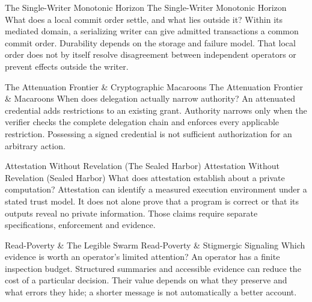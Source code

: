 \expandafter\def\csname pdlandmarktitle@05\endcsname{The Single-Writer Monotonic Horizon}
\expandafter\def\csname pdlandmarkconcept@05\endcsname{The Single-Writer Monotonic Horizon}
\expandafter\def\csname pdlandmarkquestion@05\endcsname{What does a local commit order settle, and what lies outside it?}
\expandafter\def\csname pdlandmarkquote@05\endcsname{Within its mediated domain, a serializing writer can give admitted transactions a common commit order. Durability depends on the storage and failure model. That local order does not by itself resolve disagreement between independent operators or prevent effects outside the writer.}

\expandafter\def\csname pdlandmarktitle@06\endcsname{The Attenuation Frontier \& Cryptographic Macaroons}
\expandafter\def\csname pdlandmarkconcept@06\endcsname{The Attenuation Frontier \& Macaroons}
\expandafter\def\csname pdlandmarkquestion@06\endcsname{When does delegation actually narrow authority?}
\expandafter\def\csname pdlandmarkquote@06\endcsname{An attenuated credential adds restrictions to an existing grant. Authority narrows only when the verifier checks the complete delegation chain and enforces every applicable restriction. Possessing a signed credential is not sufficient authorization for an arbitrary action.}

\expandafter\def\csname pdlandmarktitle@07\endcsname{Attestation Without Revelation (The Sealed Harbor)}
\expandafter\def\csname pdlandmarkconcept@07\endcsname{Attestation Without Revelation (Sealed Harbor)}
\expandafter\def\csname pdlandmarkquestion@07\endcsname{What does attestation establish about a private computation?}
\expandafter\def\csname pdlandmarkquote@07\endcsname{Attestation can identify a measured execution environment under a stated trust model. It does not alone prove that a program is correct or that its outputs reveal no private information. Those claims require separate specifications, enforcement and evidence.}

\expandafter\def\csname pdlandmarktitle@08\endcsname{Read-Poverty \& The Legible Swarm}
\expandafter\def\csname pdlandmarkconcept@08\endcsname{Read-Poverty \& Stigmergic Signaling}
\expandafter\def\csname pdlandmarkquestion@08\endcsname{Which evidence is worth an operator's limited attention?}
\expandafter\def\csname pdlandmarkquote@08\endcsname{An operator has a finite inspection budget. Structured summaries and accessible evidence can reduce the cost of a particular decision. Their value depends on what they preserve and what errors they hide; a shorter message is not automatically a better account.}

